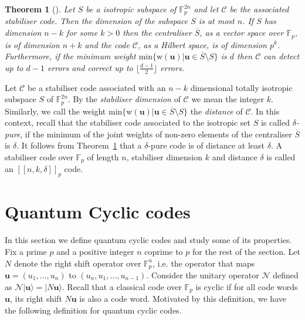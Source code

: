 \documentclass[conference]{IEEEtran}
\renewcommand{\=}{\approx}
\newcommand{\floor}[1]{\lfloor #1 \rfloor}
\newcommand{\N}{\mathcal{N}}
\newcommand{\ket}[1]{|#1\rangle}
\newcommand{\weight}[1]{\ensuremath{\mathrm{w}\left(#1\right)}}
\newcommand{\centraliser}[1]{\ensuremath{\overline{#1}}}
\newtheorem{theorem}{Theorem}[section]
\begin{document}
\begin{theorem}[\cite{calderbank97orthogonal,Ashikhmin2000nonbinary, arvind2003family}]
  \label{thm:isotropic-main-properties}
  Let $S$ be a isotropic subspace of $\mathbb{F}_p^{2n}$ and let
  $\mathcal{C}$ be the associated stabiliser code. Then the dimension
  of the subspace $S$ is at most $n$. If $S$ has dimension $n - k$ for
  some $k> 0$ then the centraliser $\centraliser{S}$, as a vector
  space over $\mathbb{F}_p$, is of dimension $n+k$ and the code
  $\mathcal{C}$, as a Hilbert space, is of dimension $p^{k}$.
  Furthermore, if the minimum weight
  $\textrm{min}\{\weight{\mathbf{u}} | \mathbf{u} \in \centraliser{S}
  \setminus S \}$ is $d$ then $\mathcal{C}$ can detect up to $d-1$
  errors and correct up to $\floor{\frac{d - 1}{2}}$ errors.
\end{theorem}

Let $\mathcal{C}$ be a stabiliser code associated with an $n-k$
dimensional totally isotropic subspace $S$ of $\mathbb{F}_p^{2n}$. By
the \emph{stabiliser dimension} of $\mathcal{C}$ we mean the integer
$k$. Similarly, we call the weight $\textrm{min}\{ \weight{\mathbf{u}}
| \mathbf{u} \in \centraliser{S} \setminus S \}$ the \emph{distance}
of $\mathcal{C}$.  In this context, recall that the stabiliser code
associated to the isotropic set $S$ is called \emph{$\delta$-pure}, if the
minimum of the joint weights of non-zero elements of the centraliser
$\centraliser{S}$ is $\delta$. It follows from
Theorem~\ref{thm:isotropic-main-properties} that a $\delta$-pure code is of
distance at least $\delta$. A stabiliser code over $\mathbb{F}_p$ of length
$n$, stabiliser dimension $k$ and distance $\delta$ is called an
$[[n,k,\delta]]_p$ code.

\section{Quantum Cyclic codes}\label{sec:quantum-cyclic-codes}

In this section we define quantum cyclic codes and study some of its
properties. Fix a prime $p$ and a positive integer $n$ coprime to $p$
for the rest of the section. Let $N$ denote the right shift operator
over $\mathbb{F}_p^n$, i.e.  the operator that maps $\mathbf{u} =
(u_1,\ldots,u_n)$ to $(u_n,u_1,\ldots,u_{n-1})$.  Consider the unitary
operator $\N$ defined as $\N \ket{\mathbf{u}} = \ket{N \mathbf{u}}$.
Recall that a classical code over $\mathbb{F}_p$ is cyclic if for all
code words $\mathbf{u}$, its right shift $N\mathbf{u}$ is also a code
word. Motivated by this definition, we have the following definition
for quantum cyclic codes.
\end{document}
